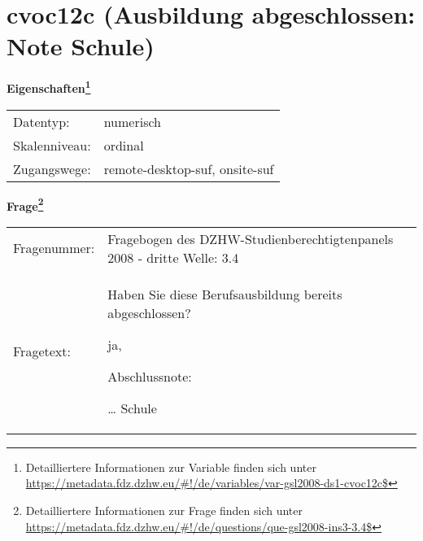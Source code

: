 
    \setcounter{footnote}{0}

    \vspace*{-1.8cm}
	\section{cvoc12c (Ausbildung abgeschlossen: Note Schule)}
	\label{section:cvoc12c}



    \vspace*{0.5cm}
    \noindent\textbf{Eigenschaften\footnote{Detailliertere Informationen zur Variable finden sich unter
		\url{https://metadata.fdz.dzhw.eu/\#!/de/variables/var-gsl2008-ds1-cvoc12c$}}}\\
	\begin{tabularx}{\hsize}{@{}lX}
	Datentyp: & numerisch \\
	Skalenniveau: & ordinal \\
	Zugangswege: &
	  remote-desktop-suf, 
	  onsite-suf
 \\
    \end{tabularx}



				\vspace*{0.5cm}
                \noindent\textbf{Frage\footnote{Detailliertere Informationen zur Frage finden sich unter
		              \url{https://metadata.fdz.dzhw.eu/\#!/de/questions/que-gsl2008-ins3-3.4$}}}\\
				\begin{tabularx}{\hsize}{@{}lX}
					Fragenummer: &
					  Fragebogen des DZHW-Studienberechtigtenpanels 2008 - dritte Welle:
					  3.4
 \\
					Fragetext: & Haben Sie diese Berufsausbildung bereits abgeschlossen?\par  ja, \par  Abschlussnote:\par  … Schule \\
				\end{tabularx}





